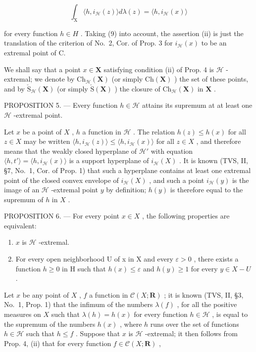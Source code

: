 \[
\int_ {\mathrm{X}} \langle h, i _ {\mathcal {H}} (z) \rangle d \lambda (z) = \langle h, i _ {\mathcal {H}} (x) \rangle
\]

for every function \(h \in H\) . Taking (9) into account, the assertion (ii) is just the translation of the criterion of No.~2, Cor. of Prop. 3 for \(i_{\mathcal{H}}(x)\) to be an extremal point of C.

We shall say that a point \(x \in \mathbf{X}\) satisfying condition (ii) of Prop. 4 is \(\mathcal{H}\) -extremal; we denote by \(\mathrm{Ch}_{\mathcal{H}}(\mathbf{X})\) (or simply \(\mathrm{Ch}(\mathbf{X})\) ) the set of these points, and by \(\check{\mathrm{S}}_{\mathcal{H}}(\mathbf{X})\) (or simply \(\check{\mathrm{S}}(\mathbf{X})\) ) the closure of \(\mathrm{Ch}_{\mathcal{H}}(\mathbf{X})\) in \(\mathbf{X}\) .

PROPOSITION 5. --- Every function \(h \in \mathcal{H}\) attains its supremum at at least one \(\mathcal{H}\) -extremal point.

Let \(x\) be a point of \(X\) , \(h\) a function in \(\mathcal{H}\) . The relation \(h(z) \leqslant h(x)\) for all \(z \in X\) may be written \(\langle h, i_{\mathcal{H}}(z) \rangle \leqslant \langle h, i_{\mathcal{H}}(x) \rangle\) for all \(z \in X\) , and therefore means that the weakly closed hyperplane of \(\mathcal{H}'\) with equation \(\langle h, t' \rangle = \langle h, i_{\mathcal{H}}(x) \rangle\) is a support hyperplane of \(i_{\mathcal{H}}(X)\) . It is known (TVS, II, §7, No.~1, Cor. of Prop. 1) that such a hyperplane contains at least one extremal point of the closed convex envelope of \(i_{\mathcal{H}}(X)\) , and such a point \(i_{\mathcal{H}}(y)\) is the image of an \(\mathcal{H}\) -extremal point \(y\) by definition; \(h(y)\) is therefore equal to the supremum of \(h\) in \(X\) .

PROPOSITION 6. --- For every point \(x \in X\) , the following properties are equivalent:

\begin{enumerate}
\def\labelenumi{\alph{enumi})}
\item
  \(x\) is \(\mathcal{H}\) -extremal.
\item
  For every open neighborhood U of x in X and every \(\varepsilon > 0\) , there exists a function \(h \geqslant 0\) in H such that \(h(x) \leqslant \varepsilon\) and \(h(y) \geqslant 1\) for every \(y \in X - U\) .
\end{enumerate}

Let \(x\) be any point of \(X\) , \(f\) a function in \(\mathcal{C}(X; \mathbf{R})\) ; it is known (TVS, II, §3, No.~1, Prop. 1) that the infimum of the numbers \(\lambda(f)\) , for all the positive measures on \(X\) such that \(\lambda(h) = h(x)\) for every function \(h \in \mathcal{H}\) , is equal to the supremum of the numbers \(h(x)\) , where \(h\) runs over the set of functions \(h \in \mathcal{H}\) such that \(h \leqslant f\) . Suppose that \(x\) is \(\mathcal{H}\) -extremal; it then follows from Prop. 4, (ii) that for every function \(f \in \mathcal{C}(X; \mathbf{R})\) ,

